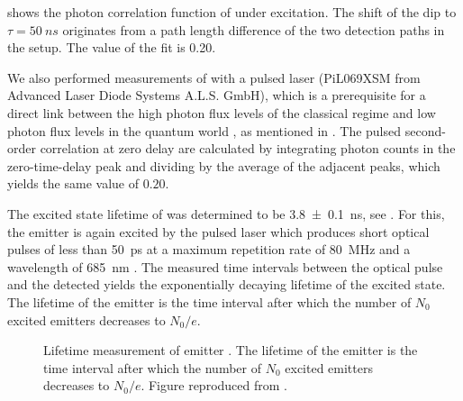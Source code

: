 		 shows the photon correlation function of \emhtwo under \cw excitation.
		The shift of the dip to $\tau=\SI{50}{ns}$ originates from a path length difference of the two detection paths in the \HBT setup.
		The \gtz value of the fit is \num{0.20}.
		
		We also performed measurements of \emhtwo with a pulsed laser (PiL069XSM from Advanced Laser Diode Systems A.L.S. GmbH), which is a prerequisite for a direct link between the high photon flux levels of the classical regime and low photon flux levels in the quantum world \cite{Vaigu2017,SiquteProject}, as mentioned in .
		The pulsed second-order correlation at zero delay \gtz are calculated by integrating photon counts in the zero-time-delay peak and dividing by the average of the adjacent peaks, which yields the same \gtz value of $0.20$.
		
		The excited state lifetime of \emhtwo was determined to be \SI[separate-uncertainty]{3.8\pm0.1}{ns}, see .
		For this, the emitter is again excited by the pulsed laser which produces short optical pulses of less than \SI{50}{\ps} at a maximum repetition rate of \SI{80}{\mega\hertz} and a wavelength of \SI{685}{\nm} \cite{Vaigu2017}. 
		The measured time intervals between the optical pulse and the detected \fl yields the exponentially decaying lifetime of the excited state.
		The lifetime of the emitter is the time interval after which the number of $N_0$ excited emitters decreases to $N_0/e$.
		
		\begin{figure}[!htb]
			\centering
			\caption[Lifetime measurement of an emitter]{Lifetime measurement of emitter \emhtwo. The lifetime of the emitter is the time interval after which the number of $N_0$ excited emitters decreases to $N_0/e$. Figure reproduced from \cite{Vaigu2017}.}
			\label{fig::lifetime}
		\end{figure}

